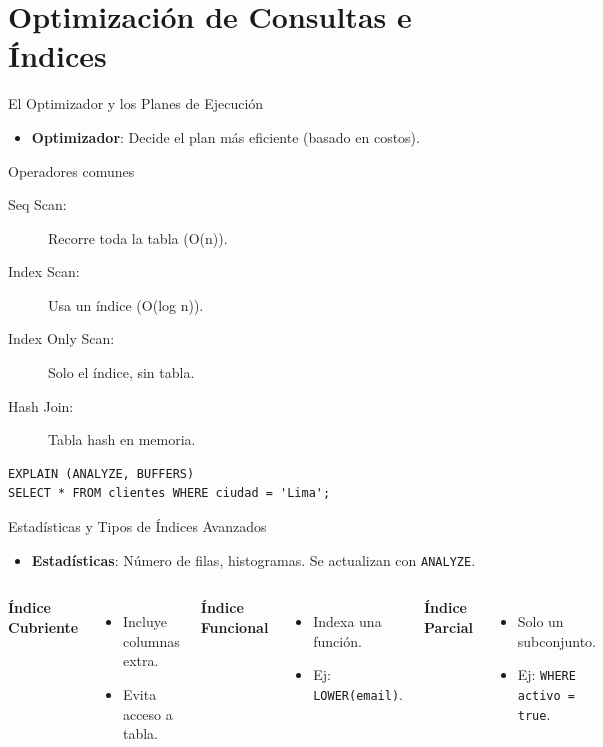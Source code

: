 \documentclass[aspectratio=169, 10pt, xcolor=table]{beamer}
\begin{document}
\section{Optimización de Consultas e Índices}

\begin{frame}[fragile]{El Optimizador y los Planes de Ejecución}
    \begin{itemize}
        \item \textbf{Optimizador}: Decide el plan más eficiente (basado en costos).
    \end{itemize}
    \begin{block}{Operadores comunes}
        \begin{description}
            \item[Seq Scan:] Recorre toda la tabla (O(n)).
            \item[Index Scan:] Usa un índice (O(log n)).
            \item[Index Only Scan:] Solo el índice, sin tabla.
            \item[Hash Join:] Tabla hash en memoria.
        \end{description}
    \end{block}
\begin{verbatim}
EXPLAIN (ANALYZE, BUFFERS) 
SELECT * FROM clientes WHERE ciudad = 'Lima';
\end{verbatim}
\end{frame}

\begin{frame}{Estadísticas y Tipos de Índices Avanzados}
    \begin{itemize}
        \item \textbf{Estadísticas}: Número de filas, histogramas. Se actualizan con \texttt{ANALYZE}.
    \end{itemize}
    \begin{columns}[t]
        \textbf{Índice Cubriente}
        \begin{itemize}
            \item Incluye columnas extra.
            \item Evita acceso a tabla.
        \end{itemize}
        \textbf{Índice Funcional}
        \begin{itemize}
            \item Indexa una función.
            \item Ej: \texttt{LOWER(email)}.
        \end{itemize}
        \textbf{Índice Parcial}
        \begin{itemize}
            \item Solo un subconjunto.
            \item Ej: \texttt{WHERE activo = true}.
        \end{itemize}
    \end{columns}
\end{frame}
\end{document}

